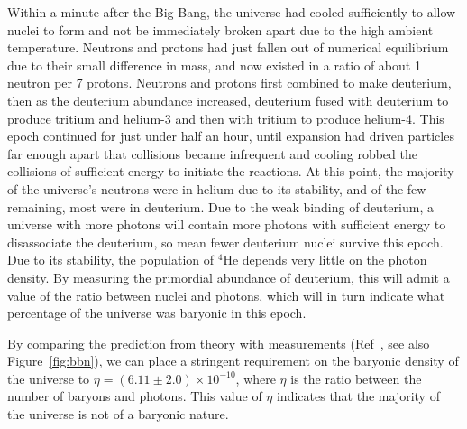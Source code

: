 Within a minute after the Big Bang, the universe had cooled sufficiently to allow nuclei to form and not be immediately broken apart due to the high ambient temperature. Neutrons and protons had just fallen out of numerical equilibrium due to their small difference in mass, and now existed in a ratio of about 1 neutron per 7 protons. Neutrons and protons first combined to make deuterium, then as the deuterium abundance increased, deuterium fused with deuterium to produce tritium and helium-3 and then with tritium to produce helium-4. This epoch continued for just under half an hour, until expansion had driven particles far enough apart that collisions became infrequent and cooling robbed the collisions of sufficient energy to initiate the reactions. At this point, the majority of the universe's neutrons were in helium due to its stability, and of the few remaining, most were in deuterium. Due to the weak binding of deuterium, a universe with more photons will contain more photons with sufficient energy to disassociate the deuterium, so mean fewer deuterium nuclei survive this epoch. Due to its stability, the population of $^4$He depends very little on the photon density. By measuring the primordial abundance of deuterium, this will admit a value of the ratio between nuclei and photons, which will in turn indicate what percentage of the universe was baryonic in this epoch.

By comparing the prediction from theory with measurements (Ref~\cite{Steigman:2007xt}, see also Figure~\ref{fig:bbn}), we can place a stringent requirement on the baryonic density of the universe to $\eta = (6.11\pm2.0)\times10^{-10}$, where $\eta$ is the ratio between the number of baryons and photons. This value of $\eta$ indicates that the majority of the universe is not of a baryonic nature.

